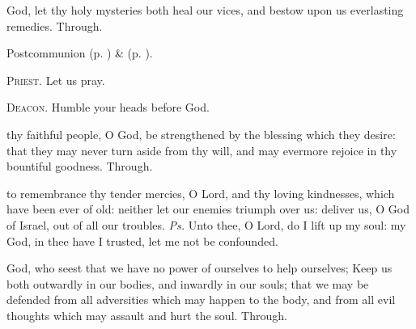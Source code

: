 
\postcommunion
{} God, let thy holy mysteries both heal our vices, and bestow upon us everlasting remedies. Through.


\begin{rubric}
     Postcommunion  (p. \pageref{AshWednesdayMassPostcommunion}) \&   (p. \pageref{SPLivingDeparted}).
\end{rubric}

\textsc{Priest.} Let us pray.\par
\textsc{Deacon.} Humble your heads before God.\par
{} thy faithful people, O God, be strengthened by the blessing which they desire: that they may never turn aside from thy will, and may evermore rejoice in thy bountiful goodness. Through.


\clearpage
{}
\fancyhead[RE,LO]{}


\vspace{-0.4\baselineskip}

\introit

\vspace{-0.2\baselineskip}

 to remembrance thy tender mercies, O Lord, and thy loving kindnesses, which have been ever of old: neither let our enemies triumph over us: deliver us, O God of Israel, out of all our troubles. \textit{Ps.} Unto thee, O Lord, do I lift up my soul: my God, in thee have I trusted, let me not be confounded.

\vspace{-0.4\baselineskip}

\collect

\vspace{-0.2\baselineskip}

 God, who seest that we have no power of ourselves to help ourselves; Keep us both outwardly in our bodies, and inwardly in our souls; that we may be defended from all adversities which may happen to the body, and from all evil thoughts which may assault and hurt the soul. Through.

